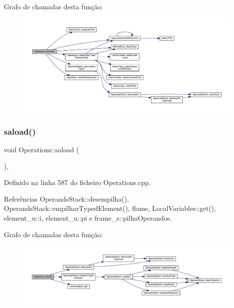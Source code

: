 Grafo de chamadas desta função\+:
\nopagebreak
\begin{figure}[H]
\begin{center}
\leavevmode
\includegraphics[width=350pt]{classOperations_ac6791ccfd8adf30d8f80b1f679f0b146_cgraph}
\end{center}
\end{figure}
\mbox{\label{classOperations_ac97743869c458c3ffcda48383308e9b4}} 
\subsubsection{\texorpdfstring{saload()}{saload()}}
{\footnotesize\ttfamily void Operations\+::saload (\begin{DoxyParamCaption}{ }\end{DoxyParamCaption})\hspace{0.3cm}{\ttfamily [static]}, {\ttfamily [private]}}



Definido na linha 587 do ficheiro Operations.\+cpp.



Referências Operands\+Stack\+::desempilha(), Operands\+Stack\+::empilhar\+Typed\+Element(), flame, Local\+Variables\+::get(), element\+\_\+u\+::i, element\+\_\+u\+::pi e frame\+\_\+s\+::pilha\+Operandos.

Grafo de chamadas desta função\+:
\nopagebreak
\begin{figure}[H]
\begin{center}
\leavevmode
\includegraphics[width=350pt]{classOperations_ac97743869c458c3ffcda48383308e9b4_cgraph}
\end{center}
\end{figure}
\mbox{\label{classOperations_aab1c34c455478d75c21cdb06d6c94172}} 
